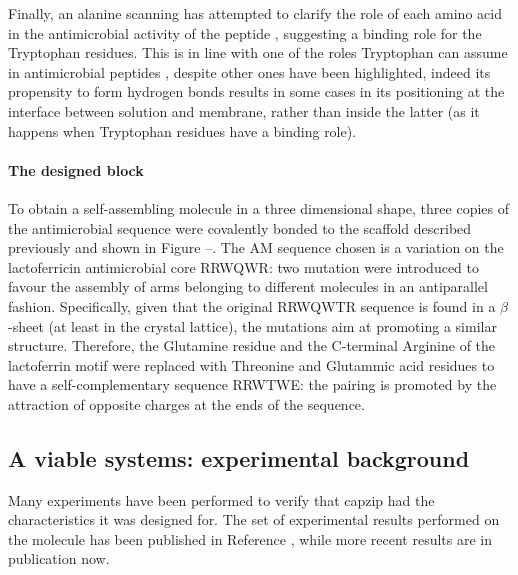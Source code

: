 Finally, an alanine scanning has attempted to clarify the role of each amino acid in the antimicrobial activity of the peptide \cite{Strom2002}, suggesting a binding role for the Tryptophan residues. This is in line with one of the roles Tryptophan can assume in antimicrobial peptides \cite{Chan2006}, despite other ones have been highlighted, indeed its propensity to form hydrogen bonds results in some cases in its positioning at the interface between solution and membrane, rather than inside the latter (as it happens when Tryptophan residues have a binding role).

\paragraph{The designed block}
To obtain a self-assembling molecule in a three dimensional shape, three copies of the antimicrobial sequence were covalently bonded to the scaffold described previously and shown in Figure --. The AM sequence chosen is a variation on the lactoferricin antimicrobial core RRWQWR: two mutation were introduced to favour the assembly of arms belonging to different molecules in an antiparallel fashion. Specifically, given that the original RRWQWTR sequence is found in a $\beta$-sheet (at least in the crystal lattice), the mutations aim at promoting a similar structure. Therefore, the Glutamine residue and the C-terminal Arginine of the lactoferrin motif were replaced with Threonine and Glutammic acid residues to have a self-complementary sequence RRWTWE: the pairing is promoted by the attraction of opposite charges at the ends of the sequence.


\subsection{A viable systems: experimental background}
Many experiments have been performed to verify that capzip had the characteristics it was designed for. The set of experimental results performed on the molecule has been published in Reference \cite{Castelletto2016}, while more recent results are in publication now.


